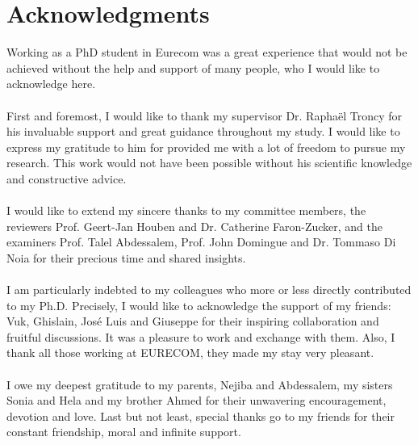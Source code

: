 \chapter*{Acknowledgments}

Working as a PhD student in Eurecom was a great experience that would not be achieved without the help and support of many people, who I would like to acknowledge here.    
\\
\\
First and foremost, I would like to thank my supervisor Dr. Rapha\"el Troncy for his invaluable support and great guidance throughout my study. I would like to express my gratitude to him for provided me with a lot of freedom to pursue my research. This work would not have been possible without his scientific knowledge and constructive advice.
\\
\\
I would like to extend my sincere thanks to my committee members, the reviewers Prof. Geert-Jan Houben and Dr. Catherine Faron-Zucker, and the examiners Prof. Talel Abdessalem, Prof. John Domingue and Dr. Tommaso Di Noia for their precious time and shared insights.
\\
\\
I am particularly indebted to my colleagues who more or less directly contributed to my Ph.D. Precisely, I would like to acknowledge the support of my friends: Vuk, Ghislain, Jos\'e Luis and Giuseppe for their inspiring collaboration and fruitful discussions. It was a pleasure to work and exchange with them. Also, I thank all those working at EURECOM, they made my stay very pleasant.
\\
\\
I owe my deepest gratitude to my parents, Nejiba and Abdessalem, my sisters Sonia and Hela and my brother Ahmed for their unwavering encouragement, devotion and love.  Last but not least, special thanks go to my friends for their constant friendship, moral and infinite support.
